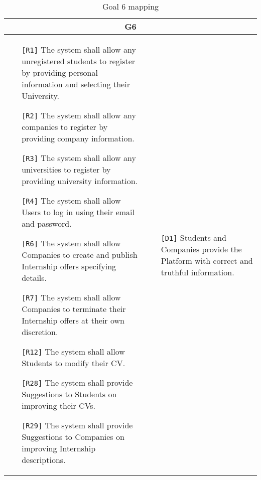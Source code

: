 \begin{table}[H]
 \centering
 \begin{tabular}{|p{8cm}|p{8cm}|}
  \hline
  \multicolumn{2}{|c|}{G6} \\
  \hline
  \begin{itemize}
   \item[\texttt{[R1]}] The system shall allow any unregistered students to register by providing personal information and selecting their University.
   \item[\texttt{[R2]}] The system shall allow any companies to register by providing company information.
   \item[\texttt{[R3]}] The system shall allow any universities to register by providing university information.
   \item[\texttt{[R4]}] The system shall allow Users to log in using their email and password.
   \item[\texttt{[R6]}] The system shall allow Companies to create and publish Internship offers specifying details.
   \item[\texttt{[R7]}] The system shall allow Companies to terminate their Internship offers at their own discretion.
   \item[\texttt{[R12]}] The system shall allow Students to modify their CV.
   \item[\texttt{[R28]}] The system shall provide Suggestions to Students on improving their CVs.
   \item[\texttt{[R29]}] The system shall provide Suggestions to Companies on improving Internship descriptions.
  \end{itemize} &
  \begin{itemize}
   \item[\texttt{[D1]}] Students and Companies provide the Platform with correct and truthful information.
  \end{itemize} \\ \hline
 \end{tabular}
 \caption{Goal 6 mapping}
 \label{tab:G6}
\end{table}

